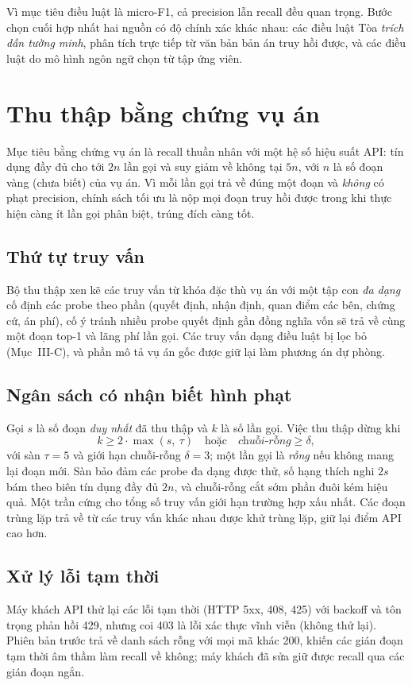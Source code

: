 \documentclass[conference]{IEEEtran}
\begin{document}
Vì mục tiêu điều luật là micro-F1, cả precision lẫn recall đều quan trọng. Bước chọn cuối hợp nhất hai nguồn có độ chính xác khác nhau: các điều luật Tòa \emph{trích dẫn tường minh}, phân tích trực tiếp từ văn bản bản án truy hồi được, và các điều luật do mô hình ngôn ngữ chọn từ tập ứng viên.

\section{Thu thập bằng chứng vụ án}
Mục tiêu bằng chứng vụ án là recall thuần nhân với một hệ số hiệu suất API: tín dụng đầy đủ cho tới $2n$ lần gọi và suy giảm về không tại $5n$, với $n$ là số đoạn vàng (chưa biết) của vụ án. Vì mỗi lần gọi trả về đúng một đoạn và \emph{không} có phạt precision, chính sách tối ưu là nộp mọi đoạn truy hồi được trong khi thực hiện càng ít lần gọi phân biệt, trúng đích càng tốt.

\subsection{Thứ tự truy vấn}
Bộ thu thập xen kẽ các truy vấn từ khóa đặc thù vụ án với một tập con \emph{đa dạng} cố định các probe theo phần (quyết định, nhận định, quan điểm các bên, chứng cứ, án phí), cố ý tránh nhiều probe quyết định gần đồng nghĩa vốn sẽ trả về cùng một đoạn top-1 và lãng phí lần gọi. Các truy vấn dạng điều luật bị lọc bỏ (Mục~III-C), và phần mô tả vụ án gốc được giữ lại làm phương án dự phòng.

\subsection{Ngân sách có nhận biết hình phạt}
Gọi $s$ là số đoạn \emph{duy nhất} đã thu thập và $k$ là số lần gọi. Việc thu thập dừng khi
\begin{equation}
  k \geq 2 \cdot \max(s,\ \tau) \quad\text{hoặc}\quad \textit{chuỗi-rỗng} \geq \delta,
  \label{eq:budget}
\end{equation}
với sàn $\tau=5$ và giới hạn chuỗi-rỗng $\delta=3$; một lần gọi là \emph{rỗng} nếu không mang lại đoạn mới. Sàn bảo đảm các probe đa dạng được thử, số hạng thích nghi $2s$ bám theo biên tín dụng đầy đủ $2n$, và chuỗi-rỗng cắt sớm phần đuôi kém hiệu quả. Một trần cứng cho tổng số truy vấn giới hạn trường hợp xấu nhất. Các đoạn trùng lặp trả về từ các truy vấn khác nhau được khử trùng lặp, giữ lại điểm API cao hơn.

\subsection{Xử lý lỗi tạm thời}
Máy khách API thử lại các lỗi tạm thời (HTTP 5xx, 408, 425) với backoff và tôn trọng phản hồi 429, nhưng coi 403 là lỗi xác thực vĩnh viễn (không thử lại). Phiên bản trước trả về danh sách rỗng với mọi mã khác 200, khiến các gián đoạn tạm thời âm thầm làm recall về không; máy khách đã sửa giữ được recall qua các gián đoạn ngắn.
\end{document}
